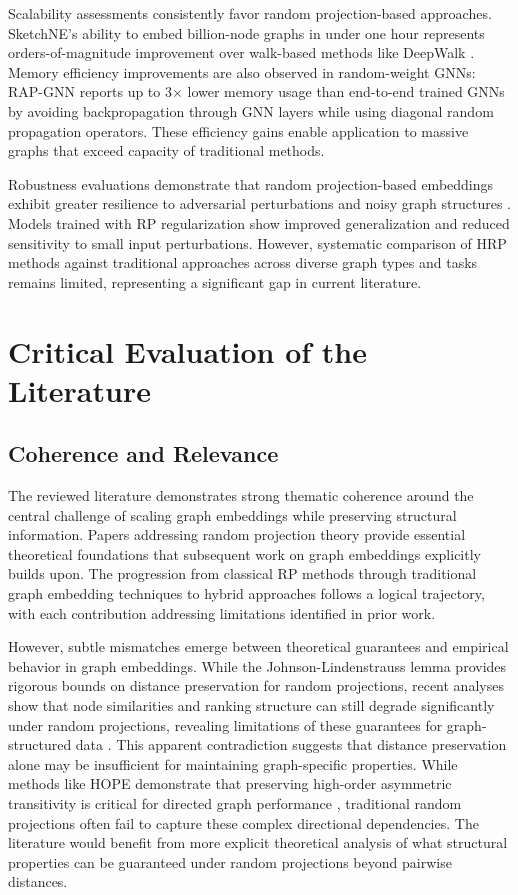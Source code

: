 \documentclass[conference]{IEEEtran}
\begin{document}
Scalability assessments consistently favor random projection-based approaches. SketchNE's ability to embed billion-node graphs in under one hour represents orders-of-magnitude improvement over walk-based methods like DeepWalk \cite{xie2023sketchne}. Memory efficiency improvements are also observed in random-weight GNNs: RAP-GNN reports up to 3× lower memory usage than end-to-end trained GNNs by avoiding backpropagation through GNN layers while using diagonal random propagation operators\cite{bui2023rap}. These efficiency gains enable application to massive graphs that exceed capacity of traditional methods.

Robustness evaluations demonstrate that random projection-based embeddings exhibit greater resilience to adversarial perturbations and noisy graph structures \cite{nguyen2016}. Models trained with RP regularization show improved generalization and reduced sensitivity to small input perturbations. However, systematic comparison of HRP methods against traditional approaches across diverse graph types and tasks remains limited, representing a significant gap in current literature.

\section{Critical Evaluation of the Literature}

\subsection{Coherence and Relevance}

The reviewed literature demonstrates strong thematic coherence around the central challenge of scaling graph embeddings while preserving structural information. Papers addressing random projection theory \cite{johnson1984, achlioptas2003, blum2006} provide essential theoretical foundations that subsequent work on graph embeddings explicitly builds upon. The progression from classical RP methods through traditional graph embedding techniques to hybrid approaches follows a logical trajectory, with each contribution addressing limitations identified in prior work.

However, subtle mismatches emerge between theoretical guarantees and empirical behavior in graph embeddings. While the Johnson-Lindenstrauss lemma provides rigorous bounds on distance preservation for random projections, recent analyses show that node similarities and ranking structure can still degrade significantly under random projections, revealing limitations of these guarantees for graph-structured data \cite{tadic2024}. This apparent contradiction suggests that distance preservation alone may be insufficient for maintaining graph-specific properties. While methods like HOPE demonstrate that preserving high-order asymmetric transitivity is critical for directed graph performance \cite{ou2016atp}, traditional random projections often fail to capture these complex directional dependencies. The literature would benefit from more explicit theoretical analysis of what structural properties can be guaranteed under random projections beyond pairwise distances.
\end{document}
